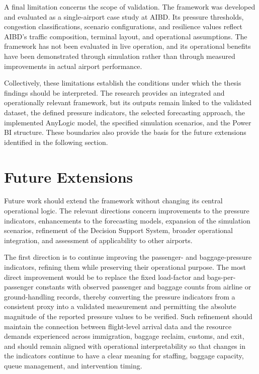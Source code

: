 A final limitation concerns the scope of validation. The framework was developed and evaluated as a single-airport case study at AIBD. Its pressure thresholds, congestion classifications, scenario configurations, and resilience values reflect AIBD’s traffic composition, terminal layout, and operational assumptions. The framework has not been evaluated in live operation, and its operational benefits have been demonstrated through simulation rather than through measured improvements in actual airport performance.

Collectively, these limitations establish the conditions under which the thesis findings should be interpreted. The research provides an integrated and operationally relevant framework, but its outputs remain linked to the validated dataset, the defined pressure indicators, the selected forecasting approach, the implemented AnyLogic model, the specified simulation scenarios, and the Power BI structure. These boundaries also provide the basis for the future extensions identified in the following section.

\section{Future Extensions}
\label{sec:future-extensions}

Future work should extend the framework without changing its central operational logic. The relevant directions concern improvements to the pressure indicators, enhancements to the forecasting models, expansion of the simulation scenarios, refinement of the Decision Support System, broader operational integration, and assessment of applicability to other airports.

The first direction is to continue improving the passenger- and baggage-pressure indicators, refining them while preserving their operational purpose. The most direct improvement would be to replace the fixed load-factor and bags-per-passenger constants with observed passenger and baggage counts from airline or ground-handling records, thereby converting the pressure indicators from a consistent proxy into a validated measurement and permitting the absolute magnitude of the reported pressure values to be verified. Such refinement should maintain the connection between flight-level arrival data and the resource demands experienced across immigration, baggage reclaim, customs, and exit, and should remain aligned with operational interpretability so that changes in the indicators continue to have a clear meaning for staffing, baggage capacity, queue management, and intervention timing.

